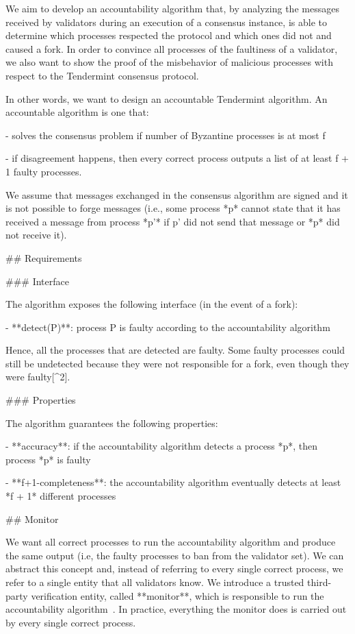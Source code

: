 \documentclass[a4paper,11pt,oneside]{report}
\begin{document}
\begin{markdown}

We aim to develop an accountability algorithm that, by analyzing the messages received by validators during an execution of a consensus instance, is able to determine which processes respected the protocol and which ones did not and caused a fork. 
In order to convince all processes of the faultiness of a validator, we also want to show the proof of the misbehavior of malicious processes with respect to the Tendermint consensus protocol.

In other words, we want to design an accountable Tendermint algorithm. An accountable algorithm is one that:

- solves the consensus problem if number of Byzantine processes is at most f

- if disagreement happens, then every correct process outputs a list of at least f + 1 faulty processes.

We assume that messages exchanged in the consensus algorithm are signed and it is not possible to forge messages (i.e., some process *p* cannot state that it has received a message from process *p'* if p' did not send that message or *p* did not receive it).

## Requirements

### Interface

The algorithm exposes the following interface (in the event of a fork):

- **detect(P)**: process P is faulty according to the accountability algorithm

Hence, all the processes that are detected are faulty. Some faulty processes could still be undetected because they were not responsible for a fork, even though they were faulty[^2].

### Properties

The algorithm guarantees the following properties:

- **accuracy**: if the accountability algorithm detects a process *p*, then process *p* is faulty

- **f+1-completeness**: the accountability algorithm eventually detects at least *f + 1* different processes

## Monitor

We want all correct processes to run the accountability algorithm and produce the same output (i.e, the faulty processes to ban from the validator set). We can abstract this concept and, instead of referring to every single correct process, we refer to a single entity that all validators know. We introduce a trusted third-party verification entity, called **monitor**, which is responsible to run the accountability algorithm~\cite{fork-accountability-specs}. In practice, everything the monitor does is carried out by every single correct process.


\end{markdown}
\end{document}
